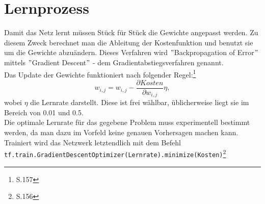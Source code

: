 \section{Lernprozess}
Damit das Netz lernt müssen Stück für Stück die Gewichte angepasst werden. Zu diesem Zweck berechnet man die Ableitung der Kostenfunktion und benutzt sie um die Gewichte abzuändern. Dieses Verfahren wird $"$Backpropagation of Error$"$ mittels $"$Gradient Descent$"$ - dem Gradientabstiegsverfahren genannt.\\
Das Update der Gewichte funktioniert nach folgender Regel:\footnote{\cite{Rojas1996}S.157}
\begin{equation}
w_{i,j}=w_{i,j}-\frac{\partial Kosten }{\partial w_{i,j}}\eta,
\end{equation}
wobei $\eta$ die Lernrate darstellt. Diese ist frei wählbar, üblicherweise liegt sie im Bereich von 0.01 und 0.5.\\
Die optimale Lernrate für das gegebene Problem muss experimentell bestimmt werden, da man dazu im Vorfeld keine genauen Vorhersagen machen kann.
Trainiert wird das Netzwerk letztendlich mit dem Befehl \lstinline$tf.train.GradientDescentOptimizer(Lernrate).minimize(Kosten)$\footnote{\cite{building}S.156}